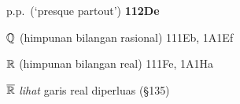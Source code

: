 p.p.\ (`presque partout') {\bf 112De}



\indexmedskip
{}

$\Bbb Q$ (himpunan bilangan rasional) 111Eb, 1A1Ef





\indexmedskip
{}

$\Bbb R$ (himpunan bilangan real) 111Fe, 1A1Ha






$\overline{\Bbb R}$ {\it lihat} garis real diperluas (\S135)



























































































